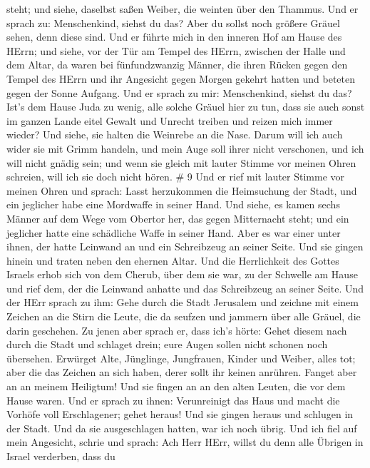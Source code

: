steht; und siehe, daselbst saßen Weiber, die weinten über den Thammus.
 Und er sprach zu: Menschenkind, siehst du das? Aber du
sollst noch größere Gräuel sehen, denn diese sind.  Und er
führte mich in den inneren Hof am Hause des HErrn; und siehe, vor der
Tür am Tempel des HErrn, zwischen der Halle und dem Altar, da waren bei
fünfundzwanzig Männer, die ihren Rücken gegen den Tempel des HErrn und
ihr Angesicht gegen Morgen gekehrt hatten und beteten gegen der Sonne
Aufgang.  Und er sprach zu mir: Menschenkind, siehst du
das? Ist's dem Hause Juda zu wenig, alle solche Gräuel hier zu tun, dass
sie auch sonst im ganzen Lande eitel Gewalt und Unrecht treiben und
reizen mich immer wieder? Und siehe, sie halten die Weinrebe an die
Nase.  Darum will ich auch wider sie mit Grimm handeln, und
mein Auge soll ihrer nicht verschonen, und ich will nicht gnädig sein;
und wenn sie gleich mit lauter Stimme vor meinen Ohren schreien, will
ich sie doch nicht hören. \# 9  Und er rief mit lauter
Stimme vor meinen Ohren und sprach: Lasst herzukommen die Heimsuchung
der Stadt, und ein jeglicher habe eine Mordwaffe in seiner Hand.
 Und siehe, es kamen sechs Männer auf dem Wege vom Obertor
her, das gegen Mitternacht steht; und ein jeglicher hatte eine
schädliche Waffe in seiner Hand. Aber es war einer unter ihnen, der
hatte Leinwand an und ein Schreibzeug an seiner Seite. Und sie gingen
hinein und traten neben den ehernen Altar.  Und die
Herrlichkeit des Gottes Israels erhob sich von dem Cherub, über dem sie
war, zu der Schwelle am Hause und rief dem, der die Leinwand anhatte und
das Schreibzeug an seiner Seite.  Und der HErr sprach zu
ihm: Gehe durch die Stadt Jerusalem und zeichne mit einem Zeichen an die
Stirn die Leute, die da seufzen und jammern über alle Gräuel, die darin
geschehen.  Zu jenen aber sprach er, dass ich's hörte: Gehet
diesem nach durch die Stadt und schlaget drein; eure Augen sollen nicht
schonen noch übersehen.  Erwürget Alte, Jünglinge,
Jungfrauen, Kinder und Weiber, alles tot; aber die das Zeichen an sich
haben, derer sollt ihr keinen anrühren. Fanget aber an an meinem
Heiligtum! Und sie fingen an an den alten Leuten, die vor dem Hause
waren.  Und er sprach zu ihnen: Verunreinigt das Haus und
macht die Vorhöfe voll Erschlagener; gehet heraus! Und sie gingen heraus
und schlugen in der Stadt.  Und da sie ausgeschlagen hatten,
war ich noch übrig. Und ich fiel auf mein Angesicht, schrie und sprach:
Ach Herr HErr, willst du denn alle Übrigen in Israel verderben, dass du
